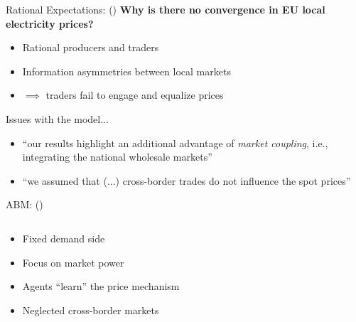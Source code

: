 \documentclass{beamer}
\begin{document}
\begin{frame}{Rational Expectations: \citeauthor{Gebhardt2013} (\citeyear{Gebhardt2013})}
    \textbf{Why is there no convergence in EU local electricity prices?}

    \begin{itemize} \setlength\itemsep{1.5em}
              \pause \item Rational producers and traders
              \pause \item Information asymmetries between local markets
              \pause \item $\implies$ traders fail to engage and equalize prices \pause
    \end{itemize}

    Issues with the model...

    \begin{itemize} \setlength\itemsep{1.5em}
        \item ``our results highlight an additional advantage of \textit{market coupling}, i.e., integrating the national wholesale markets''
        \item ``we assumed that (...) cross-border trades do not influence the spot prices''
    \end{itemize}

\end{frame}

\begin{frame}{ABM: \citeauthor{Weidlich2008} (\citeyear{Weidlich2008})}

    \begin{columns}[T,onlytextwidth]

        \begin{column}{.4\textwidth}
            \begin{itemize} \setlength\itemsep{1.5em}
                \item Fixed demand side \pause
                \item Focus on market power \pause
                \item Agents ``learn'' the price mechanism \pause
                \item Neglected cross-border markets
            \end{itemize}
        \end{column}

        \hfill

        \begin{column}{.6\textwidth}
            \centering
            \resizebox{0.7\textwidth}{!}{}
        \end{column}
    \end{columns}

\end{frame}
\end{document}
